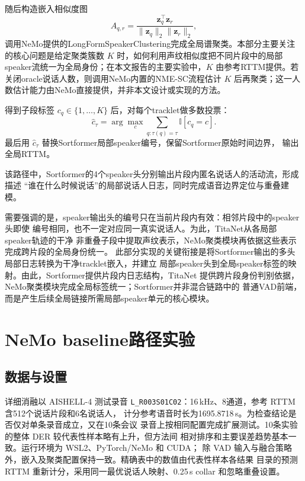 \documentclass[UTF8,a4paper,10pt]{ctexart}
\begin{document}
随后构造嵌入相似度图
\begin{equation}
A_{q,r}=\frac{\mathbf{z}_q^\top \mathbf{z}_r}
{\|\mathbf{z}_q\|_2\|\mathbf{z}_r\|_2},
\end{equation}
调用NeMo提供的LongFormSpeakerClustering完成全局谱聚类。本部分主要关注的核心问题是给定聚类簇数 $K$ 时，如何利用声纹相似度把不同片段中的局部speaker流统一为全局身份；在本文报告的主要实验中，$K$ 由参考RTTM提供。若关闭oracle说话人数，则调用NeMo内置的NME-SC流程估计 $K$ 后再聚类；这一人数估计能力由NeMo直接提供，并非本文设计或实现的方法。

得到子段标签
$c_q\in\{1,\ldots,K\}$ 后，对每个tracklet做多数投票：
\begin{equation}
\hat c_{\tau}=
\arg\max_{c}
\sum_{q:\tau(q)=\tau}\mathbb{I}[c_q=c].
\end{equation}
最后用 $\hat c_{\tau}$ 替换Sortformer局部speaker编号，保留Sortformer原始时间边界，
输出全局RTTM。

该路径中，Sortformer的4个speaker头分别输出片段内匿名说话人的活动流，形成描述
“谁在什么时候说话”的局部说话人日志，同时完成语音边界定位与重叠建模。

需要强调的是，speaker输出头的编号只在当前片段内有效：相邻片段中的speaker头即使
编号相同，也不一定对应同一真实说话人。为此，TitaNet从各局部speaker轨迹的干净
非重叠子段中提取声纹表示，NeMo聚类模块再依据这些表示完成跨片段的全局身份统一。
此部分实现的关键衔接是将Sortformer输出的多头局部日志转换为干净tracklet嵌入，并建立
局部speaker头到全局speaker标签的映射。由此，Sortformer提供片段内日志结构，TitaNet
提供跨片段身份判别依据，NeMo聚类模块完成全局标签统一；Sortformer并非混合链路中的
普通VAD前端，而是产生后续全局链接所需局部speaker单元的核心模块。

\section{NeMo baseline路径实验}

\subsection{数据与设置}

详细消融以 AISHELL-4 测试录音
\texttt{L\_R003S01C02}：16\,kHz、8通道，参考 RTTM 含512个说话片段和6名说话人，
计分参考语音时长为1695.8718\,s。为检查结论是否仅对单条录音成立，又在10条会议
录音上按相同配置完成扩展测试。10条实验的整体 DER 较代表性样本略有上升，但方法间
相对排序和主要误差趋势基本一致。运行环境为 WSL2、PyTorch/NeMo 和 CUDA；
除 VAD 输入与融合策略外，嵌入及聚类配置保持一致。精确表中的数值由代表性样本各结果
目录的预测 RTTM 重新计分，采用同一最优说话人映射、0.25\,s collar 和忽略重叠设置。
\end{document}
